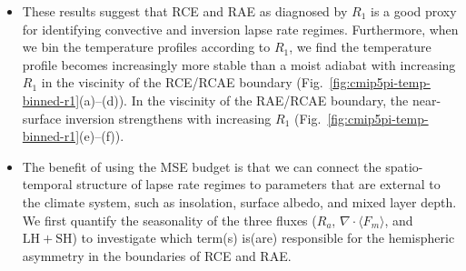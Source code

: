 \documentclass{ametsocV5}
\begin{document}
\begin{itemize}
  \item These results suggest that RCE and RAE as diagnosed by \(R_{1}\) is a good proxy for identifying convective and inversion lapse rate regimes. Furthermore, when we bin the temperature profiles according to $R_{1}$, we find the temperature profile becomes increasingly more stable than a moist adiabat with increasing $R_{1}$ in the viscinity of the RCE/RCAE boundary (Fig.~\ref{fig:cmip5pi-temp-binned-r1}(a)--(d)). In the viscinity of the RAE/RCAE boundary, the near-surface inversion strengthens with increasing $R_{1}$ (Fig.~\ref{fig:cmip5pi-temp-binned-r1}(e)--(f)).
  \item The benefit of using the MSE budget is that we can connect the spatio-temporal structure of lapse rate regimes to parameters that are external to the climate system, such as insolation, surface albedo, and mixed layer depth. We first quantify the seasonality of the three fluxes (\(R_{a}\), \(\nabla\cdot\langle F_{m}\rangle\), and \(\mathrm{LH+SH}\)) to investigate which term(s) is(are) responsible for the hemispheric asymmetry in the boundaries of RCE and RAE.

\end{itemize}
\end{document}
